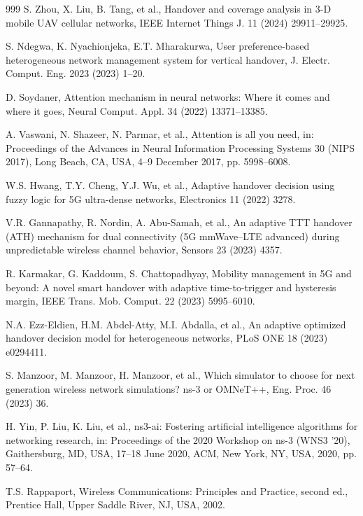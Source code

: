 \documentclass[preprint,12pt]{elsarticle}
\begin{document}
\begin{thebibliography}{999}
S. Zhou, X. Liu, B. Tang, et al., Handover and coverage analysis in 3-D mobile UAV cellular networks, IEEE Internet Things J. 11 (2024) 29911--29925.

S. Ndegwa, K. Nyachionjeka, E.T. Mharakurwa, User preference-based heterogeneous network management system for vertical handover, J. Electr. Comput. Eng. 2023 (2023) 1--20.

D. Soydaner, Attention mechanism in neural networks: Where it comes and where it goes, Neural Comput. Appl. 34 (2022) 13371--13385.

A. Vaswani, N. Shazeer, N. Parmar, et al., Attention is all you need, in: Proceedings of the Advances in Neural Information Processing Systems 30 (NIPS 2017), Long Beach, CA, USA, 4--9 December 2017, pp. 5998--6008.

W.S. Hwang, T.Y. Cheng, Y.J. Wu, et al., Adaptive handover decision using fuzzy logic for 5G ultra-dense networks, Electronics 11 (2022) 3278.

V.R. Gannapathy, R. Nordin, A. Abu-Samah, et al., An adaptive TTT handover (ATH) mechanism for dual connectivity (5G mmWave--LTE advanced) during unpredictable wireless channel behavior, Sensors 23 (2023) 4357.

R. Karmakar, G. Kaddoum, S. Chattopadhyay, Mobility management in 5G and beyond: A novel smart handover with adaptive time-to-trigger and hysteresis margin, IEEE Trans. Mob. Comput. 22 (2023) 5995--6010.

N.A. Ezz-Eldien, H.M. Abdel-Atty, M.I. Abdalla, et al., An adaptive optimized handover decision model for heterogeneous networks, PLoS ONE 18 (2023) e0294411.

S. Manzoor, M. Manzoor, H. Manzoor, et al., Which simulator to choose for next generation wireless network simulations? ns-3 or OMNeT++, Eng. Proc. 46 (2023) 36.

H. Yin, P. Liu, K. Liu, et al., ns3-ai: Fostering artificial intelligence algorithms for networking research, in: Proceedings of the 2020 Workshop on ns-3 (WNS3 '20), Gaithersburg, MD, USA, 17--18 June 2020, ACM, New York, NY, USA, 2020, pp. 57--64.

T.S. Rappaport, Wireless Communications: Principles and Practice, second ed., Prentice Hall, Upper Saddle River, NJ, USA, 2002.
\end{thebibliography}
\end{document}

